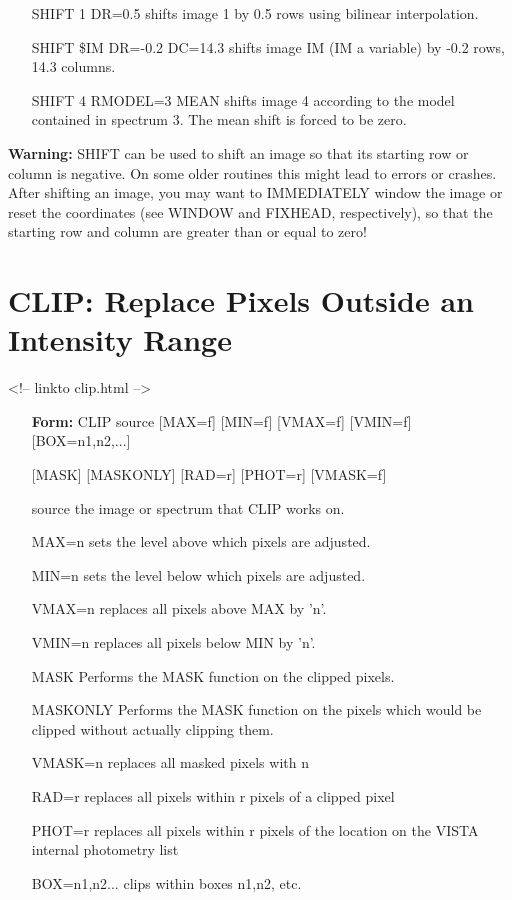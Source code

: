 \begin{itemize}
  \item[SHIFT 1 DR=0.5\hfill]{shifts image 1 by 0.5 rows using
     bilinear interpolation.}
  \item[SHIFT \$IM DR=-0.2 DC=14.3\hfill]{shifts image IM (IM a variable)
     by -0.2 rows, 14.3 columns.}
  \item[SHIFT 4 RMODEL=3 MEAN  \hfill]{shifts image 4 according to the
     model contained in spectrum 3.
     The mean shift is forced to be zero.}
\end{itemize}

\textbf{Warning:} SHIFT can be used to shift an image so that its starting row
or column is negative.  On some older routines this might lead to errors or
crashes. After shifting an image, you may want to IMMEDIATELY window the
image or reset the coordinates (see WINDOW and FIXHEAD, respectively), so
that the starting row and column are greater than or equal to zero!

\section{CLIP: Replace Pixels Outside an Intensity Range}
\begin{rawhtml}
<!-- linkto clip.html -->
\end{rawhtml}

\begin{itemize}
  \item[\textbf{Form: } CLIP source {[MAX=f]} {[MIN=f]} {[VMAX=f]} {[VMIN=f]} 
       {[BOX=n1,n2,...]}\hfill]{}
  \item[]{{[MASK]} {[MASKONLY]} {[RAD=r]} {[PHOT=r]} {[VMASK=f]}}
  \item[source]{the image or spectrum that CLIP works on.}
  \item[MAX=n]{sets the level above which pixels are adjusted.}
  \item[MIN=n]{sets the level below which pixels are adjusted.}
  \item[VMAX=n]{replaces all pixels above MAX by 'n'.}
  \item[VMIN=n]{replaces all pixels below MIN by 'n'.}
  \item[MASK]{Performs the MASK function on the clipped pixels.}
  \item[MASKONLY]{Performs the MASK function on the pixels which
       would be clipped without actually clipping them.}
  \item[VMASK=n]{replaces all masked pixels with n}
  \item[RAD=r]{replaces all pixels within r pixels of a clipped pixel}
  \item[PHOT=r]{replaces all pixels within r pixels of the location
       on the VISTA internal photometry list}
  \item[BOX=n1,n2...]{clips within boxes n1,n2, etc.}
\end{itemize}

